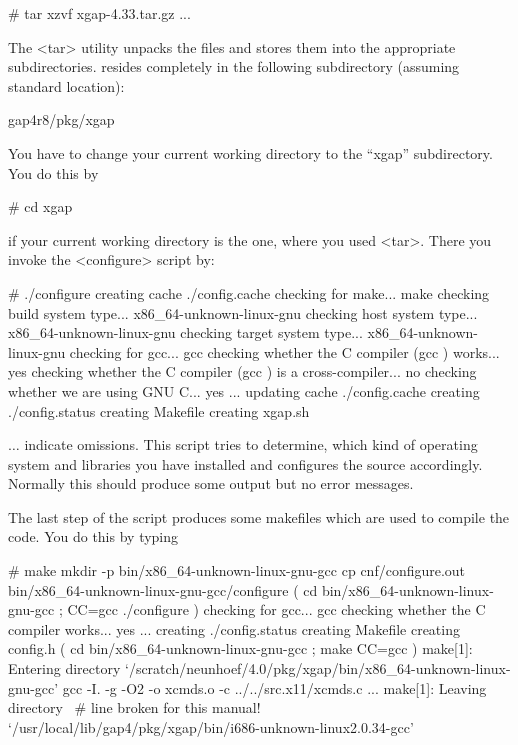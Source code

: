 \begintt
# tar xzvf xgap-4.33.tar.gz
...
\endtt

The <tar> utility unpacks the files and stores them into the appropriate
subdirectories. {\XGAP} resides completely in the following subdirectory
(assuming standard location):

\begintt
gap4r8/pkg/xgap
\endtt


You have to change your current working directory to the ``xgap''
subdirectory. You do this by

\begintt
# cd xgap
\endtt

if your current working directory is the one, where you used
<tar>. There you invoke the <configure> script by:

\begintt
# ./configure
creating cache ./config.cache
checking for make... make
checking build system type... x86_64-unknown-linux-gnu
checking host system type... x86_64-unknown-linux-gnu
checking target system type... x86_64-unknown-linux-gnu
checking for gcc... gcc
checking whether the C compiler (gcc  ) works... yes
checking whether the C compiler (gcc  ) is a cross-compiler... no
checking whether we are using GNU C... yes
...
updating cache ./config.cache
creating ./config.status
creating Makefile
creating xgap.sh
\endtt

$\ldots$ indicate omissions. 
This script tries to determine, which kind of operating system and
libraries you have installed and configures the source
accordingly. Normally this should produce some output but no error
messages. 

The last step of the script produces some makefiles which are
used to compile the code. You do this by typing

\begintt
# make
mkdir -p bin/x86_64-unknown-linux-gnu-gcc
cp cnf/configure.out bin/x86_64-unknown-linux-gnu-gcc/configure
( cd bin/x86_64-unknown-linux-gnu-gcc ; CC=gcc ./configure  )
checking for gcc... gcc
checking whether the C compiler works... yes
...
creating ./config.status
creating Makefile
creating config.h
( cd bin/x86_64-unknown-linux-gnu-gcc ; make CC=gcc )
make[1]: Entering directory 
`/scratch/neunhoef/4.0/pkg/xgap/bin/x86_64-unknown-linux-gnu-gcc'
gcc -I. -g -O2   -o xcmds.o -c ../../src.x11/xcmds.c
...
make[1]: Leaving directory \                    # line broken for this manual!
     `/usr/local/lib/gap4/pkg/xgap/bin/i686-unknown-linux2.0.34-gcc'
\endtt

